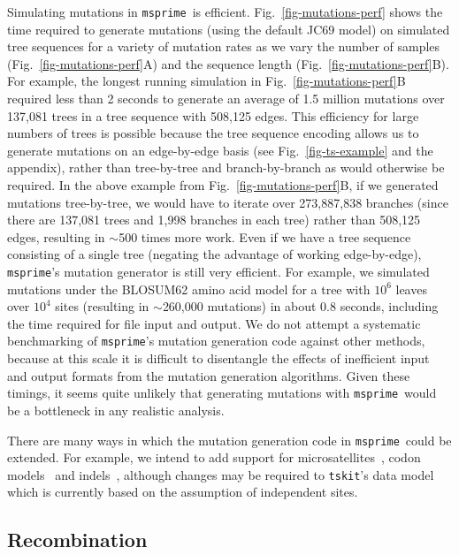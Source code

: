 \documentclass{article}
\newcommand{\msprime}[0]{\texttt{msprime}}
\newcommand{\tskit}[0]{\texttt{tskit}}
\begin{document}
Simulating mutations in \msprime\ is efficient.
Fig.~\ref{fig-mutations-perf} shows the time required to generate
mutations (using the default JC69 model) on
simulated tree sequences for a variety of mutation
rates as we vary the number of samples
(Fig.~\ref{fig-mutations-perf}A) and the sequence
length (Fig.~\ref{fig-mutations-perf}B).
For example, the longest running simulation in
Fig.~\ref{fig-mutations-perf}B required less than 2 seconds to
generate an average of 1.5 million mutations over 137,081 trees
in a tree sequence with 508,125 edges.
This efficiency for large numbers of trees is possible because
the tree sequence encoding allows us to generate mutations
on an edge-by-edge basis
(see Fig.~\ref{fig-ts-example} and the~
appendix),
rather than tree-by-tree and branch-by-branch as would otherwise be required.
In the above example from Fig.~\ref{fig-mutations-perf}B,
if we generated mutations tree-by-tree, we would have to iterate over 273,887,838 branches
(since there are 137,081 trees and 1,998 branches in each
tree) rather than 508,125 edges, resulting in $\sim$500 times more work.
Even if we have a tree sequence consisting of a single tree
(negating the advantage of working edge-by-edge),
\msprime's mutation generator is still very efficient.
For example, we simulated mutations under the BLOSUM62 amino
acid model for a tree with $10^6$ leaves over $10^4$ sites (resulting
in $\sim$260,000 mutations) in about $0.8$ seconds, including
the time required for file input and output.
We do not attempt a systematic benchmarking of \msprime's
mutation generation code against other methods, because at this scale it is
difficult to disentangle the effects of inefficient input and
output formats from the mutation generation algorithms.
Given these timings, it seems quite unlikely
that generating mutations with \msprime\ would be a bottleneck in any
realistic analysis.

There are many ways in which the mutation generation code
in \msprime\ could be extended. For example, we intend to add support for
microsatellites~\citep{mailund2005coasim},
codon models~\citep{arenas2007recodon}
and indels~\citep{cartwright2005dna,fletcher2009indelible},
although changes may be required to \tskit's data model
which is currently based on the assumption of independent sites.

\subsection*{Recombination}
\label{sec-recombination}
\end{document}
